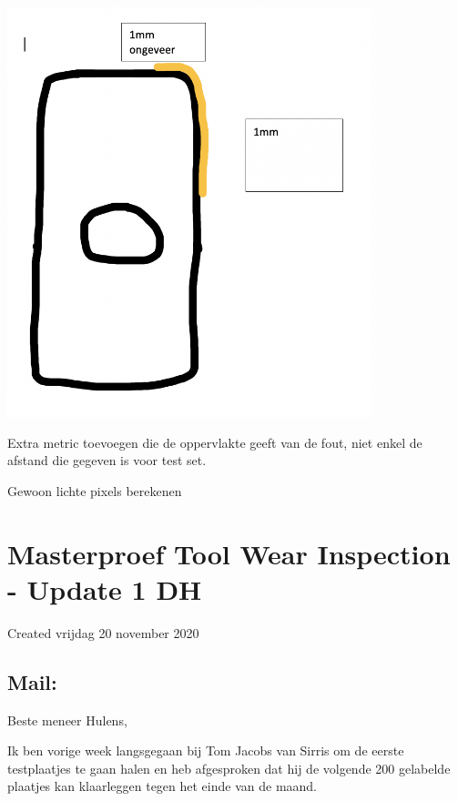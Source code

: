 \documentclass{article}
\begin{document}
\includegraphics[width=4.166667in, keepaspectratio=true]{./ZimFiles_files/Verslagen/Activiteiten_rapport/Activities/Masterproef_Tool_Wear_Inspection_-_Meeting3_TJ/Screenshot 2020-11-20 at 15.20.56.png}



Extra metric toevoegen die de oppervlakte geeft van de fout, niet enkel de afstand die gegeven is voor test set. 

Gewoon lichte pixels berekenen






		\section{Masterproef Tool Wear Inspection - Update 1 DH}

Created vrijdag 20 november 2020





\subsection{Mail:}

Beste meneer Hulens,

 

Ik ben vorige week langsgegaan bij Tom Jacobs van Sirris om de eerste testplaatjes te gaan halen en heb afgesproken dat hij de volgende 200 gelabelde plaatjes kan klaarleggen tegen het einde van de maand.
\end{document}
